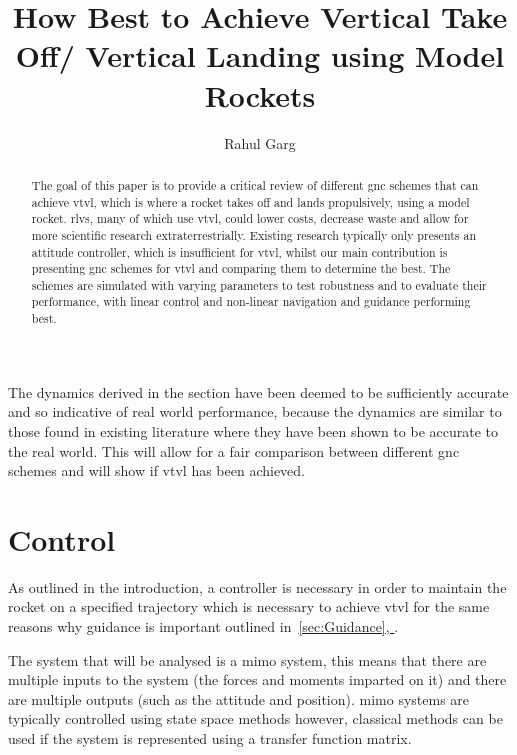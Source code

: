 \documentclass{article}
\title{How Best to Achieve Vertical Take Off/ Vertical Landing using Model Rockets}
\author{Rahul Garg}
\newcommand*{\fullrefnocomma}[1]{\hyperref[{#1}]{\autoref*{#1}, \nameref*{#1}}} %
\begin{document}
\maketitle

\begingroup
\hypersetup{linkcolor=black}
\tableofcontents
\endgroup

\newpage

\printunsrtglossary[type=notation]
\printunsrtglossary[type=operators]

\newpage
\begin{abstract}
  The goal of this paper is to provide a critical review of different \gls{gnc} schemes that can achieve \gls{vtvl}, which is where a rocket takes off and lands propulsively, using a model rocket.
  \Glspl{rlv}, many of which use \gls{vtvl}, could lower costs, decrease waste and allow for more scientific research extraterrestrially. 
  Existing research typically only presents an  \gls{attitude} controller, which is insufficient for \gls{vtvl}, whilst our main contribution is presenting \gls{gnc} schemes for \gls{vtvl} and comparing them to determine the best.
  The schemes are simulated with varying parameters to test robustness and to evaluate their performance, with linear control and non-linear navigation and guidance performing best.
\end{abstract}
%

%


%


%
The dynamics derived in the section have been deemed to be sufficiently accurate and so indicative of real world performance, because the dynamics are similar to those found in existing literature where they have been shown to be accurate to the real world. This will allow for a fair comparison between different \gls{gnc} schemes and will show if \gls{vtvl} has been achieved.
%

%

%

%
\section{Control} 
\label{sec:Control}
As outlined in the introduction, a controller is necessary in order to maintain the rocket on a specified trajectory which is necessary to achieve \gls{vtvl} for the same reasons why guidance is important outlined in~\fullrefnocomma{sec:Guidance}.

The system that will be analysed is a \gls{mimo} system, this means that there are multiple inputs to the system (the forces and moments imparted on it) and there are multiple outputs (such as the \gls{attitude} and position).
\gls{mimo} systems are typically controlled using state space methods however, classical methods can be used if the system is represented using a transfer function matrix.
\end{document}
